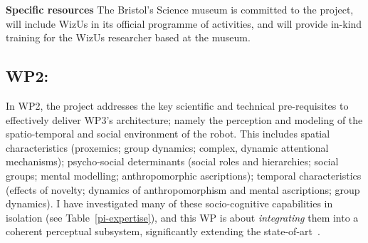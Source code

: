 \documentclass[11pt,a4paper]{report}
\newcommand{\project}{WizUs\xspace}
\begin{document}
\textbf{Specific resources} The Bristol's Science museum is committed to the
project, will include \project in its official programme of activities, and will
provide in-kind training for the \project researcher based at the museum.

% 
% 
% 
% 
% 
% 
% 
% 
% 



\subsection{WP2: \textbf{\wpTwo}}


In WP2, the project addresses the key scientific and technical pre-requisites to
effectively deliver WP3's architecture; namely the perception and modeling of
the spatio-temporal and social environment of the robot. This includes spatial
characteristics (proxemics; group dynamics; complex, dynamic attentional
mechanisms); psycho-social determinants (social roles and hierarchies; social
groups; mental modelling; anthropomorphic ascriptions); temporal characteristics
(effects of novelty; dynamics of anthropomorphism and mental ascriptions; group
dynamics). I have investigated many of these socio-cognitive capabilities in
isolation (see Table~\ref{pi-expertise}), and this WP is about
\emph{integrating} them into a coherent perceptual subsystem, significantly
extending the state-of-art~\cite{lemaignan2017artificial, baxter2016cognitive}.
\end{document}
